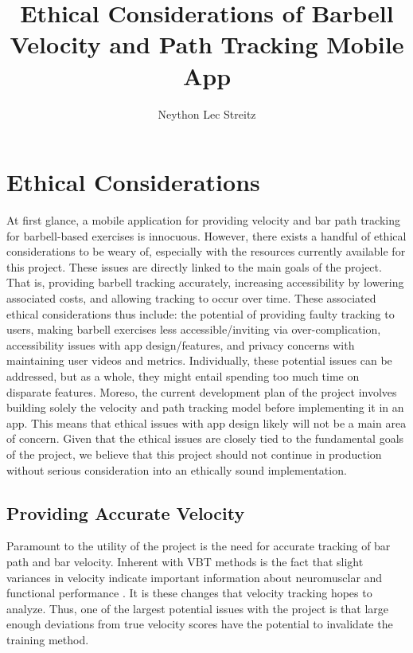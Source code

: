\documentclass[10pt,twocolumn]{article}
\title{Ethical Considerations of Barbell Velocity and Path Tracking Mobile App}
\author{Neython Lec Streitz}
\affiliation{Occidental College}
\begin{document}
\maketitle

\section{Ethical Considerations}
At first glance, a mobile application for providing velocity and bar path tracking for barbell-based exercises is innocuous. However, there exists a handful of ethical considerations to be weary of, especially with the resources currently available for this project. These issues are directly linked to the main goals of the project. That is, providing barbell tracking accurately, increasing accessibility by lowering associated costs, and allowing tracking to occur over time. These associated ethical considerations thus include: the potential of providing faulty tracking to users, making barbell exercises less accessible/inviting via over-complication, accessibility issues with app design/features, and privacy concerns with maintaining user videos and metrics. Individually, these potential issues can be addressed, but as a whole, they might entail spending too much time on disparate features. Moreso, the current development plan of the project involves building solely the velocity and path tracking model before implementing it in an app. This means that ethical issues with app design likely will not be a main area of concern. Given that the ethical issues are closely tied to the fundamental goals of the project, we believe that this project should not continue in production without serious consideration into an ethically sound implementation.

\subsection{Providing Accurate Velocity}
Paramount to the utility of the project is the need for accurate tracking of bar path and bar velocity. Inherent with VBT methods is the fact that slight variances in velocity indicate important information about neuromusclar and functional performance \cite{Dorrell2020}. It is these changes that velocity tracking hopes to analyze. Thus, one of the largest potential issues with the project is that large enough deviations from true velocity scores have the potential to invalidate the training method.  \par
\end{document}
